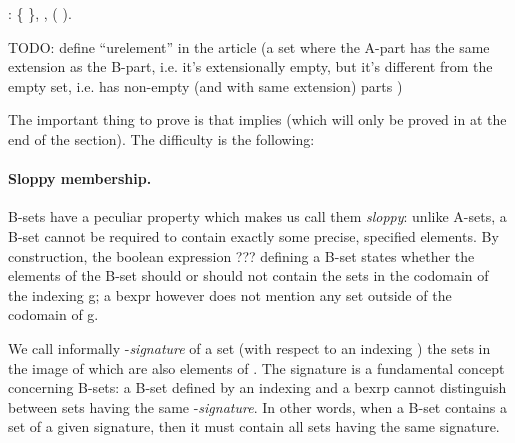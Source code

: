   \begin{coqdoccode}
  \coqdocnoindent
   : \coqdockw{\ensuremath{\forall}} \{ \},\coqdoceol
  \coqdocindent{1.00em}
  \coqdockw{\ensuremath{\forall}} ,  \INX {}   \INX {}   ( \SXOR {}).\coqdoceol
  \end{coqdoccode}

  TODO: define ``urelement'' in the article (a set where the A-part has the same extension as the B-part, i.e. it's extensionally empty, but it's different from the empty set, i.e. has non-empty (and with same extension) parts )


  The important thing to prove is that   implies  \EQX {} (which will only be proved in  at the end of the section). The difficulty is the following: 
  

\paragraph{Sloppy membership.}
B-sets have a peculiar property which makes us call them \emph{sloppy}: unlike A-sets, a B-set cannot be required to contain exactly some precise, specified elements. By construction, the boolean expression ??? defining a B-set states whether the elements of the B-set should or should not contain the sets in the codomain of the indexing g; a bexpr however does not mention any set outside of the codomain of g.

We call informally -\emph{signature} of a set  (with respect to an indexing ) the sets in the image of  which are also elements of . The signature is a fundamental concept concerning B-sets: a B-set defined by an indexing  and a bexrp  cannot distinguish between sets having the same -\emph{signature}. In other words, when a B-set contains a set of a given signature, then it must contain all sets having the same signature.

